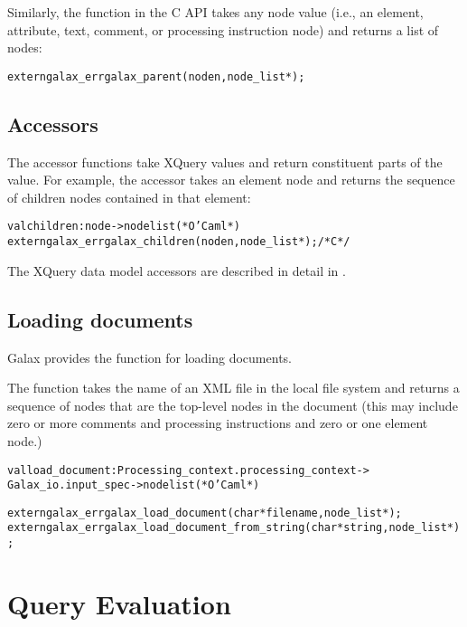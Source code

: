   Similarly, the function  in the C API takes any node value (i.e., an
  element, attribute, text, comment, or processing instruction node)
  and returns a list of nodes:
\begin{alltt}
    extern galax\_err galax\_parent(node n, node\_list *);
\end{alltt}

\subsection{Accessors}
  The accessor functions take XQuery values and return constituent
  parts of the value.  For example, the  accessor takes an
  element node and returns the sequence of children nodes contained in
  that element: 
\begin{alltt}
    val children : node -> node list      (* O'Caml *)
    extern galax\_err galax\_children(node n, node\_list *); /* C */
\end{alltt}

  The XQuery data model accessors are described in detail in 
  {\datamodelurl}. 

\subsection{Loading documents}
  Galax provides the  function for loading documents.

  The  function takes the name of an XML file in the
  local file system and returns a sequence of nodes that are the
  top-level nodes in the document (this may include zero or more
  comments and processing instructions and zero or one element node.)

\begin{alltt}
  val load\_document : Processing\_context.processing\_context -> 
    Galax\_io.input\_spec -> node list (* O'Caml *)
\end{alltt}

\begin{alltt}
  extern galax\_err galax\_load\_document(char* filename, node\_list *);
  extern galax\_err galax\_load\_document\_from\_string(char* string, node\_list *); 
\end{alltt}

\section{Query Evaluation}

